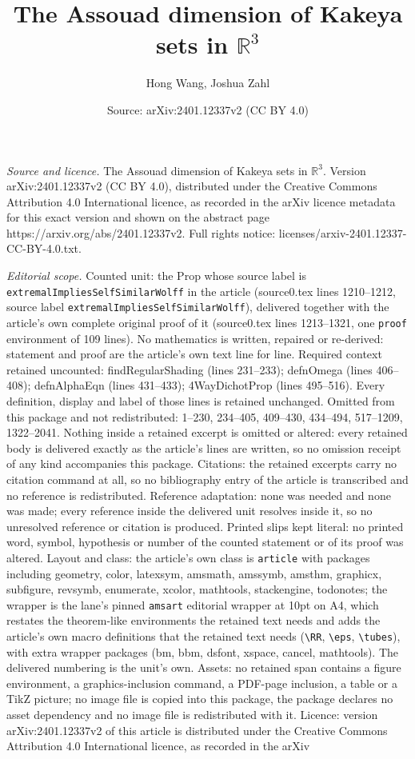 \documentclass[10pt,a4paper]{amsart}
\title[The Assouad dimension of Kakeya sets in $\mathbb{R}^3$]{The Assouad dimension of Kakeya sets in $\mathbb{R}^3$}
\author{Hong Wang, Joshua Zahl}
\date{Source: arXiv:2401.12337v2 (CC BY 4.0)}
\begin{document}
\maketitle

\noindent\emph{Source and licence.} The Assouad dimension of Kakeya sets in $\mathbb{R}^3$. Version arXiv:2401.12337v2 (CC BY 4.0), distributed under the Creative Commons Attribution 4.0 International licence, as recorded in the arXiv licence metadata for this exact version and shown on the abstract page https://arxiv.org/abs/2401.12337v2. Full rights notice: licenses/arxiv-2401.12337-CC-BY-4.0.txt.\par\smallskip

\noindent\textit{Editorial scope.} Counted unit: the Prop whose source label is \texttt{extremalImpliesSelfSimilarWolff} in the article (source0.tex lines 1210--1212, source label \texttt{extremalImpliesSelfSimilarWolff}), delivered together with the article's own complete original proof of it (source0.tex lines 1213--1321, one \texttt{proof} environment of 109 lines). No mathematics is written, repaired or re-derived: statement and proof are the article's own text line for line. Required context retained uncounted: findRegularShading (lines 231--233); defnOmega (lines 406--408); defnAlphaEqn (lines 431--433); 4WayDichotProp (lines 495--516). Every definition, display and label of those lines is retained unchanged. Omitted from this package and not redistributed: 1--230, 234--405, 409--430, 434--494, 517--1209, 1322--2041. Nothing inside a retained excerpt is omitted or altered: every retained body is delivered exactly as the article's lines are written, so no omission receipt of any kind accompanies this package. Citations: the retained excerpts carry no citation command at all, so no bibliography entry of the article is transcribed and no reference is redistributed. Reference adaptation: none was needed and none was made; every reference inside the delivered unit resolves inside it, so no unresolved reference or citation is produced. Printed slips kept literal: no printed word, symbol, hypothesis or number of the counted statement or of its proof was altered. Layout and class: the article's own class is \texttt{article} with packages including geometry, color, latexsym, amsmath, amssymb, amsthm, graphicx, subfigure, revsymb, enumerate, xcolor, mathtools, stackengine, todonotes; the wrapper is the lane's pinned \texttt{amsart} editorial wrapper at 10pt on A4, which restates the theorem-like environments the retained text needs and adds the article's own macro definitions that the retained text needs (\texttt{\textbackslash RR}, \texttt{\textbackslash eps}, \texttt{\textbackslash tubes}), with extra wrapper packages (bm, bbm, dsfont, xspace, cancel, mathtools). The delivered numbering is the unit's own. Assets: no retained span contains a figure environment, a graphics-inclusion command, a PDF-page inclusion, a table or a TikZ picture; no image file is copied into this package, the package declares no asset dependency and no image file is redistributed with it. Licence: version arXiv:2401.12337v2 of this article is distributed under the Creative Commons Attribution 4.0 International licence, as recorded in the arXiv 
\end{document}
